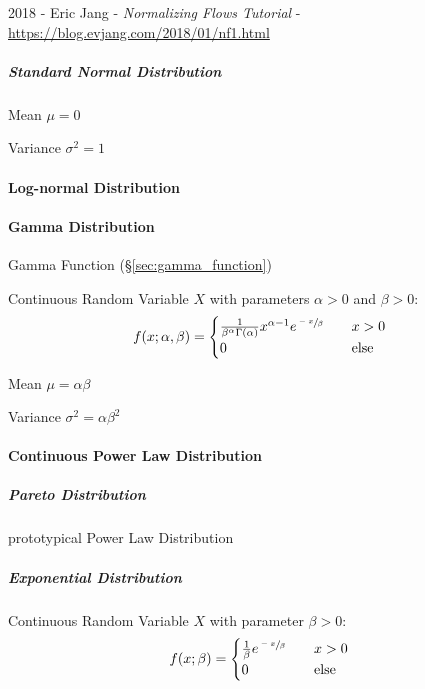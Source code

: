 2018 - Eric Jang
- \emph{Normalizing Flows Tutorial}
- \url{https://blog.evjang.com/2018/01/nf1.html}



\subparagraph{Standard Normal Distribution}\label{sec:standard_normal}\hfill

Mean $\mu = 0$

Variance $\sigma^2 = 1$



\paragraph{Log-normal Distribution}\label{sec:lognormal_distribution}\hfill

\paragraph{Gamma Distribution}\label{sec:gamma_distribution}\hfill

Gamma Function (\S\ref{sec:gamma_function})

Continuous Random Variable $X$ with parameters $\alpha > 0$ and $\beta
> 0$:
\[
  f(x; \alpha, \beta) =
  \begin{cases}
  \frac{1}{\beta^\alpha \Gamma(\alpha)} x^{\alpha-1} e^{\sfrac{-x}{\beta}}     & \quad x > 0 \\
  0     & \quad\text{else} \\
  \end{cases}
\]

Mean $\mu = \alpha \beta$

Variance $\sigma^2 = \alpha \beta^2$



\paragraph{Continuous Power Law Distribution}
\label{sec:continuous_power_law_distribution}\hfill

\subparagraph{Pareto Distribution}\label{sec:pareto_distribution}\hfill

prototypical Power Law Distribution



\subparagraph{Exponential Distribution}\label{sec:exponential_squared}\hfill

Continuous Random Variable $X$ with parameter $\beta > 0$:
\[
  f(x; \beta) =
  \begin{cases}
  \frac{1}{\beta} e^{\sfrac{-x}{\beta}}     & \quad x > 0 \\
  0     & \quad\text{else} \\
  \end{cases}
\]



